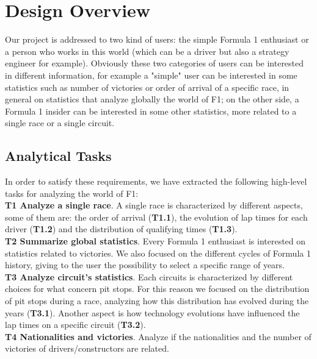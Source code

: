 \documentclass[11pt,twocolumn,letterpaper]{article}
\begin{document}
\section{Design Overview}
Our project is addressed to two kind of users: the simple Formula 1 enthusiast or a person who works in this world (which can be a driver but also a strategy engineer for example). Obviously these two categories of users can be interested in different information, for example a "simple" user can be interested in some statistics such as number of victories or order of arrival of a specific race, in general on statistics that analyze globally the world of F1; on the other side, a Formula 1 insider can be interested in some other statistics, more related to a single race or a single circuit.

\subsection{Analytical Tasks}
In order to satisfy these requirements, we have extracted the following high-level tasks for analyzing the world of F1:\\
\textbf{T1 Analyze a single race}. A single race is characterized by different aspects, some of them are: the order of arrival (\textbf{T1.1}), the evolution of lap times for each driver (\textbf{T1.2}) and the distribution of qualifying times (\textbf{T1.3}).\\
\textbf{T2 Summarize global statistics}. Every Formula 1 enthusiast is interested on statistics related to victories. We also focused on the different cycles of Formula 1 history, giving to the user the possibility to select a specific range of years.\\
\textbf{T3 Analyze circuit's statistics}. Each circuits is characterized by different choices for what concern pit stops. For this reason we focused on the distribution of pit stops during a race, analyzing how this distribution has evolved during the years (\textbf{T3.1}). Another aspect is how technology evolutions have influenced the lap times on a specific circuit (\textbf{T3.2}).\\
\textbf{T4 Nationalities and victories}. Analyze if the nationalities and the number of victories of drivers/constructors are related.
\end{document}
